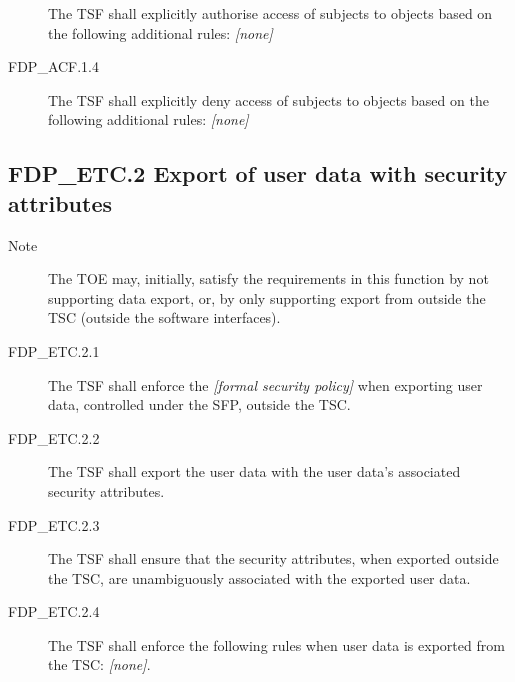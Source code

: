 \documentclass[10pt,a4paper,english]{scrbook}
\begin{document}
\begin{description}
The TSF shall explicitly authorise access of subjects to
objects based on the following additional rules: \emph{{[}none]}

\item[FDP{\_}ACF.1.4]

The TSF shall explicitly deny access of subjects to objects
based on the following additional rules: \emph{{[}none]}

\end{description}



\hypertarget{fdp-etc-2-export-of-user-data-with-security-attributes}{}
\subsection{FDP{\_}ETC.2 Export of user data with security attributes}
\begin{description}
\item[Note]

The TOE may, initially, satisfy the requirements in this
function by not supporting data export, or, by only
supporting export from outside the TSC (outside the
software interfaces).

\item[FDP{\_}ETC.2.1]

The TSF shall enforce the \emph{{[}formal security policy]} when exporting user
data, controlled under the SFP, outside the TSC.

\item[FDP{\_}ETC.2.2]

The TSF shall export the user data with the user data's associated 
security attributes.

\item[FDP{\_}ETC.2.3]

The TSF shall ensure that the security attributes, when 
exported outside the TSC, are unambiguously associated 
with the exported user data.

\item[FDP{\_}ETC.2.4]

The TSF shall enforce the following rules when user data 
is exported from the TSC: \emph{{[}none]}.

\end{description}
\end{document}
